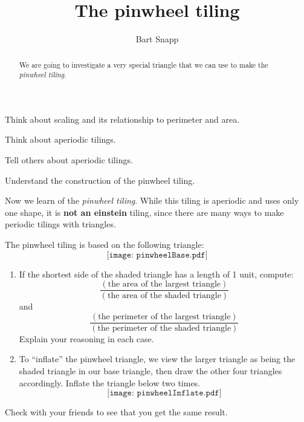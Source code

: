 \documentclass[noauthor,nooutcomes,handout,hints,12pt]{ximera}
\title{The pinwheel tiling}
\author{Bart Snapp}
\begin{document}
\begin{abstract}
   We are going to investigate a very special triangle that we can use
   to make the \textit{pinwheel tiling}.
\end{abstract}
\maketitle

\begin{listOutcomes}
\item Think about scaling and its relationship to perimeter and area.
\item Think about aperiodic tilings.
\item Tell others about aperiodic tilings.
\item Understand the construction of the pinwheel tiling.
\end{listOutcomes}

Now we learn of the \textit{pinwheel tiling}. While this tiling is
aperiodic and uses only one shape, it is \textbf{not an einstein}
tiling, since there are many ways to make periodic tilings with
triangles.


\mynewpage

\begin{question}
The pinwheel tiling is based on the following triangle:
\[
\texttt{[image: pinwheelBase.pdf]}
\]

\begin{enumerate}
\item If the shortest side of the shaded triangle has a length of 1
  unit, compute:
  \[
      \frac{(\text{the area of the largest triangle})}{(\text{the area of the shaded triangle})}
  \]
  and
  \[
  \frac{(\text{the perimeter of the largest triangle})}{(\text{the perimeter of the shaded triangle})}
  \]
Explain your reasoning in each case.

\vfill
  
\item To ``inflate'' the pinwheel triangle, we view the larger
  triangle as being the shaded triangle in our base triangle, then
  draw the other four triangles accordingly. Inflate the triangle
  below two times.
  \[
  \texttt{[image: pinwheelInflate.pdf]}
  \]
\end{enumerate}
Check with your friends to see that you get the same result.
\end{question}

\mynewpage
\end{document}
